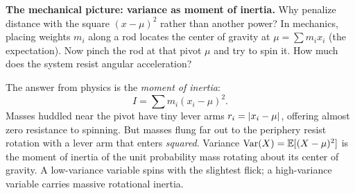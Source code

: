 \begin{intuitionbox}
\textbf{The mechanical picture: variance as moment of inertia.}
Why penalize distance with the square $(x-\mu)^2$ rather than another power?
In mechanics, placing weights $m_i$ along a rod locates the center of gravity at
$\mu = \sum m_i x_i$ (the expectation). Now pinch the rod at that pivot $\mu$ and try
to spin it. How much does the system resist angular acceleration?

The answer from physics is the \emph{moment of inertia}:
\[
  I = \sum m_i (x_i - \mu)^2.
\]
Masses huddled near the pivot have tiny lever arms $r_i = \lvert x_i - \mu\rvert$, offering
almost zero resistance to spinning. But masses flung far out to the periphery resist
rotation with a lever arm that enters \emph{squared}. Variance $\operatorname{Var}(X) = \operatorname{\mathbb{E}}[(X-\mu)^2]$
is the moment of inertia of the unit probability mass rotating about its
center of gravity. A low-variance variable spins with the slightest flick; a
high-variance variable carries massive rotational inertia.
\end{intuitionbox}


